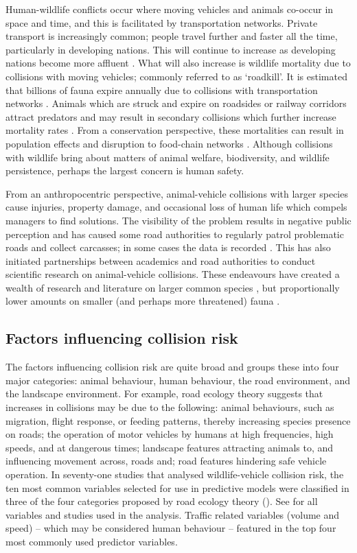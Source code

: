 Human-wildlife conflicts occur where moving vehicles and animals co-occur in space and time, and this is facilitated by transportation networks. Private transport is increasingly common; people travel further and faster all the time, particularly in developing nations. This will continue to increase as developing nations become more affluent \citep{rvdr15}. What will also increase is wildlife mortality due to collisions with moving vehicles; commonly referred to as `roadkill'. It is estimated that billions of fauna expire annually due to collisions with transportation networks \citep{seil06}. Animals which are struck and expire on roadsides or railway corridors attract predators and may result in secondary collisions which further increase mortality rates \citep{spel98}. From a conservation perspective, these mortalities can result in population effects and disruption to food-chain networks \citep{ramp06b,cham10,pola14}.  Although collisions with wildlife bring about matters of animal welfare, biodiversity, and wildlife persistence, perhaps the largest concern is human safety. 

From an anthropocentric perspective, animal-vehicle collisions with larger species cause injuries, property damage, and occasional loss of human life which compels managers to find solutions. The visibility of the problem results in negative public perception and has caused some road authorities to regularly patrol problematic roads and collect carcasses; in some cases the data is recorded \citep{huij07a}. This has also initiated partnerships between academics and road authorities to conduct scientific research on animal-vehicle collisions.  These endeavours have created a wealth of research and literature on larger common species \citep{biss08b,clev02,romi96,sudh09}, but proportionally lower amounts on smaller (and perhaps more threatened) fauna \citep{clev03}.

\subsection{Factors influencing collision risk}

The factors influencing collision risk are quite broad and \cite{form03} groups these into four major categories: animal behaviour, human behaviour, the road environment, and the landscape environment. For example, road ecology theory suggests that increases in collisions may be due to the following: animal behaviours, such as migration, flight response, or feeding patterns, thereby increasing species presence on roads; the operation of motor vehicles by humans at high frequencies, high speeds, and at dangerous times; landscape features attracting animals to, and influencing movement across, roads and; road features hindering safe vehicle operation. In seventy-one studies that analysed wildlife-vehicle collision risk, the ten most common variables selected for use in predictive models were classified in three of the four categories proposed by road ecology theory (). See  for all variables and studies used in the analysis. Traffic related variables (volume and speed) -- which may be considered human behaviour -- featured in the top four most commonly used predictor variables.

